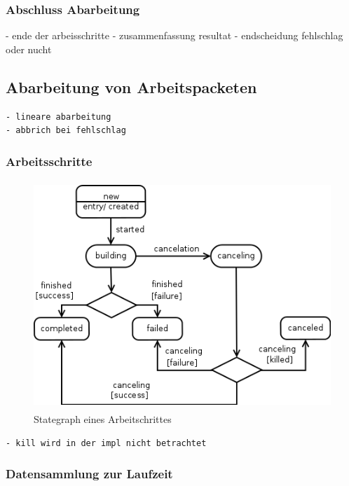 \subsubsection{Abschluss Abarbeitung}

- ende der arbeisschritte
- zusammenfassung resultat
- endscheidung fehlschlag oder nucht


\subsection{Abarbeitung von Arbeitspacketen}

\begin{verbatim}
- lineare abarbeitung
- abbrich bei fehlschlag
\end{verbatim}

\subsubsection{Arbeitsschritte}


\begin{figure}[ht] 
  \label{fig:lebenszyklus-arbeitsschritt}
  \begin{center}
      \includegraphics[height=3.4in]{imageinput/lebenszyklus-arbeitsschritt.png}
  \end{center}
  \caption{Stategraph eines Arbeitschrittes}
\end{figure}

\begin{verbatim}
- kill wird in der impl nicht betrachtet

\end{verbatim}


\subsubsection{Datensammlung zur Laufzeit}

